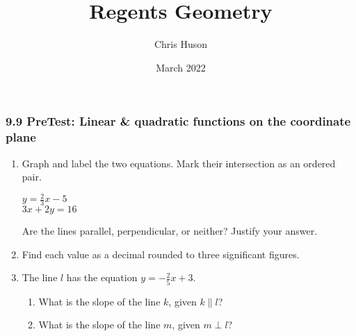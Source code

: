 \documentclass[12pt, twoside]{article}
\title{Regents Geometry}
\author{Chris Huson}
\date{March 2022}
\begin{document}
\subsubsection*{9.9 PreTest: Linear \& quadratic functions on the coordinate plane}
  \begin{enumerate}

  \item Graph and label the two equations. Mark their intersection as an ordered pair.

    \begin{multicols}{2}
      $y = \frac{2}{3}x-5$ \\
      $3x+2y = 16$
    \end{multicols}
    Are the lines parallel, perpendicular, or neither? Justify your answer.
    \vspace{1.5cm}

    \begin{center} %
    \end{center}

\item Find each value as a decimal rounded to three significant figures.
  \begin{enumerate}
  \end{enumerate}
  \vspace{0.5cm}

\newpage
  \item The line $l$ has the equation $y=-\frac{2}{5} x+3$.
  \begin{enumerate}
    \item What is the slope of the line $k$, given $k \parallel l$?
    \vspace{1cm}
    \item What is the slope of the line $m$, given $m \perp l$?
    \vspace{1cm}
  \end{enumerate}


\end{enumerate}
\end{document}
